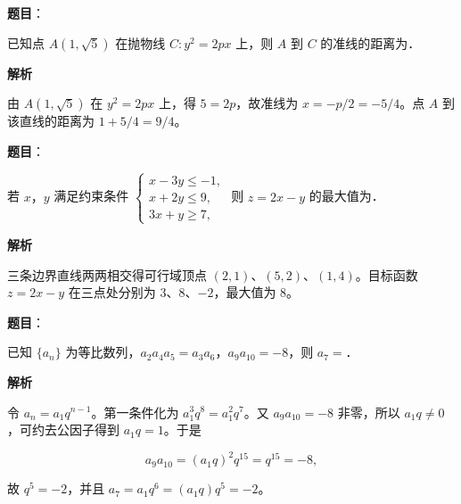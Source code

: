 \begin{answer}

\textbf{题目}：

已知点 $A(1,\sqrt5)$ 在抛物线 $C:y^2=2px$ 上，则 $A$ 到 $C$ 的准线的距离为\gkblank{}．

\textbf{解析}

由 $A(1,\sqrt5)$ 在 $y^2=2px$ 上，得 $5=2p$，故准线为 $x=-p/2=-5/4$。点 $A$ 到该直线的距离为 $1+5/4=9/4$。


\end{answer}
\begin{answer}

\textbf{题目}：

若 $x\text{，}y$ 满足约束条件 $\begin{cases}x-3y\leqslant-1,\\x+2y\leqslant9,\\3x+y\geqslant7,\end{cases}$ 则 $z=2x-y$ 的最大值为\gkblank{}．

\textbf{解析}

三条边界直线两两相交得可行域顶点 $(2,1)$、$(5,2)$、$(1,4)$。目标函数 $z=2x-y$ 在三点处分别为 $3$、$8$、$-2$，最大值为 $8$。


\end{answer}
\begin{answer}

\textbf{题目}：

已知 $\{a_n\}$ 为等比数列，$a_2a_4a_5=a_3a_6$，$a_9a_{10}=-8$，则 $a_7=$\gkblank{}．

\textbf{解析}

令 $a_n=a_1q^{n-1}$。第一条件化为 $a_1^3q^8=a_1^2q^7$。又 $a_9a_{10}=-8$ 非零，所以 $a_1q\ne0$，可约去公因子得到 $a_1q=1$。于是

\nopagebreak[4]
\[
a_9a_{10}=(a_1q)^2q^{15}=q^{15}=-8,
\]

故 $q^5=-2$，并且 $a_7=a_1q^6=(a_1q)q^5=-2$。


\end{answer}
